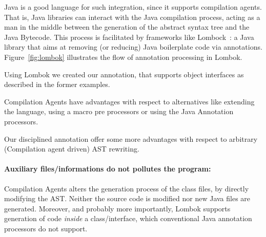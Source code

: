 Java is a good language for such integration, since it supports compilation agents\cite{compilationagents}.
That is, Java libraries can interact with the Java compilation process,
acting as a man in the middle between the 
generation of the abstract syntax tree and the Java Bytecode.
This process is facilitated by frameworks like Lombock~\cite{lombok}:
a Java library that aims at removing (or
reducing) Java boilerplate code via
annotations.
Figure~\ref{fig:lombok} illustrates the
flow of \mixin annotation processing in Lombok.

Using Lombok we created our \mixin annotation, that supports object
interfaces as described in the former examples.
 
Compilation Agents have advantages with respect to
alternatives like extending the language, using a macro pre processors 
or using the Java Annotation processors.

Our disciplined \mixin annotation offer some more advantages with respect to arbitrary (Compilation agent driven) AST rewriting.


\paragraph{Auxiliary files/informations do not pollutes the program:}
Compilation Agents alters the generation process of the class files,
by directly modifying the AST.
Neither the source code is modified nor new Java files are generated.
Moreover, and probably more importantly, Lombok supports generation of
  code \emph{inside} a class/interface, which conventional
  Java annotation processors do not support.

